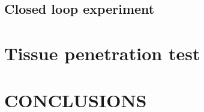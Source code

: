 \documentclass[letterpaper, 10 pt, conference]{ieeeconf}  %
\begin{document}
\subsection{Closed loop experiment}

\section{Tissue penetration test}


   



\section{CONCLUSIONS}


\addtolength{\textheight}{-12cm}   %







\end{document}
